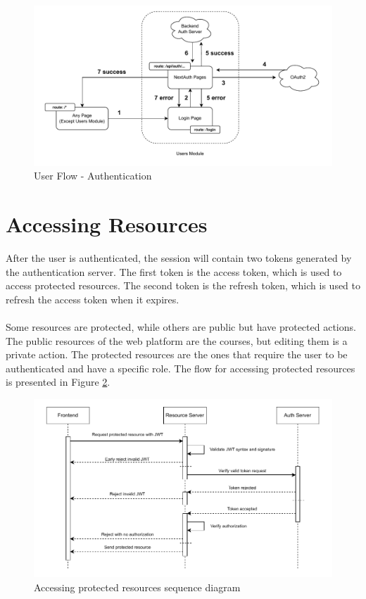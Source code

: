 \begin{figure}[h]
    \centering
    \includegraphics[scale=0.85]{images/user-auth-flow.pdf}
    \caption{User Flow - Authentication}
    \label{fig:user-auth-flow}
\end{figure}

\section{Accessing Resources}

\noindent After the user is authenticated, the session will contain two tokens generated by the authentication server. The first token is the access token, which is used to access protected resources. The second token is the refresh token, which is used to refresh the access token when it expires.
\\\\
\noindent Some resources are protected, while others are public but have protected actions. The public resources of the web platform are the courses, but editing them is a private action. The protected resources are the ones that require the user to be authenticated and have a specific role. The flow for accessing protected resources is presented in Figure \ref{fig:protected-resources-sequence}.

\begin{figure}[h]
    \centering
    \includegraphics{images/accessing-protected-resources-flow.pdf}
    \caption{Accessing protected resources sequence diagram}
    \label{fig:protected-resources-sequence}
\end{figure}

